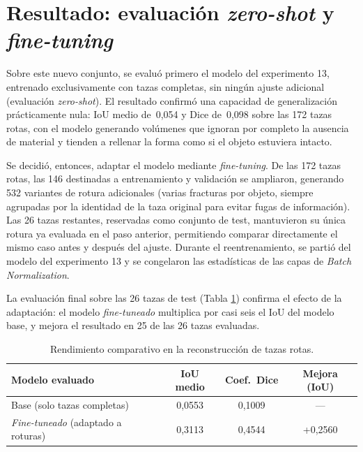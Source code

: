 \documentclass[10pt,a4paper]{report}
\begin{document}
\section{Resultado: evaluación \textit{zero-shot} y \textit{fine-tuning}}
\label{sec:resultados_roturas}

Sobre este nuevo conjunto, se evaluó primero el modelo del experimento 13, entrenado
exclusivamente con tazas completas, sin ningún ajuste adicional (evaluación
\textit{zero-shot}).
El resultado confirmó una capacidad de generalización prácticamente nula: IoU medio
de~0,054 y Dice de~0,098 sobre las 172 tazas rotas, con el modelo generando volúmenes que ignoran por completo la ausencia de material y tienden a rellenar la forma como si el objeto estuviera intacto.

Se decidió, entonces, adaptar el modelo mediante \textit{fine-tuning}. De las 172 tazas rotas, las 146 destinadas a entrenamiento y validación se ampliaron, generando 532 variantes de rotura adicionales (varias fracturas por objeto, siempre agrupadas por la identidad de la taza original para evitar fugas de información). Las 26 tazas restantes, reservadas como conjunto de test, mantuvieron su única rotura ya evaluada en el paso anterior, permitiendo comparar directamente el mismo caso antes y después del ajuste. Durante el reentrenamiento, se partió del modelo del experimento 13 y se congelaron las estadísticas de las capas de \textit{Batch Normalization}.

La evaluación final sobre las 26 tazas de test (Tabla \ref{tab:roturas}) confirma el efecto de la adaptación: el modelo \textit{fine-tuneado} multiplica por casi seis el IoU del modelo base, y mejora el resultado en 25 de las 26 tazas evaluadas.

\begin{table}[H]
  \centering
  \begin{tabular}{lccc}
    \toprule
    Modelo evaluado & IoU medio & Coef.\ Dice & Mejora (IoU) \\
    \midrule
    Base (solo tazas completas)     & 0,0553 & 0,1009 & --- \\
    \textit{Fine-tuneado} (adaptado a roturas) & 0,3113 & 0,4544 & +0,2560 \\
    \bottomrule
  \end{tabular}
  \caption{Rendimiento comparativo en la reconstrucción de tazas rotas.}
  \label{tab:roturas}
\end{table}
\end{document}
